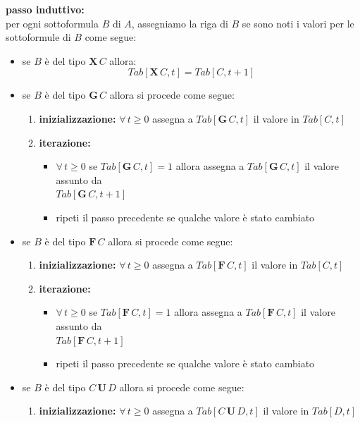 \documentclass[a4paper,12pt, oneside]{book}
\begin{document}
\newpage
\textbf{passo induttivo:}\\
per ogni sottoformula $B$ di $A$, assegniamo la riga di $B$ se sono noti
i valori per le sottoformule di $B$ come segue:
\begin{itemize}
  \item se $B$ è del tipo $\mathbf{X}\,C$ allora:
  \[Tab[\mathbf{X}\, C, t] = Tab[C, t + 1]\]
  \item se $B$ è del tipo $\mathbf{G}\,C$ allora si procede come segue:
  \begin{enumerate}
    \item \textbf{inizializzazione:} $\forall\,t\geq 0$ assegna a
    $Tab[\mathbf{G}\,C, t]$ il valore in $Tab[C, t]$
    \item \textbf{iterazione:}
    \begin{itemize}
      \item $\forall\,t\geq 0$ se $Tab[\mathbf{G}\,C, t] = 1$ allora assegna
      a $Tab[\mathbf{G}\, C, t]$ il valore assunto da \\$Tab[\mathbf{G}\, C,
      t+1]$
      \item ripeti il passo precedente se qualche valore è stato cambiato
    \end{itemize}
  \end{enumerate}
  \item se $B$ è del tipo $\mathbf{F}\,C$ allora si procede come segue:
  \begin{enumerate}
    \item \textbf{inizializzazione:} $\forall\,t\geq 0$ assegna a
    $Tab[\mathbf{F}\,C, t]$ il valore in $Tab[C, t]$
    \item \textbf{iterazione:}
    \begin{itemize}
      \item $\forall\,t\geq 0$ se $Tab[\mathbf{F}\,C, t] = 1$ allora assegna
      a $Tab[\mathbf{F}\, C, t]$ il valore assunto da \\$Tab[\mathbf{F}\, C,
      t+1]$
      \item ripeti il passo precedente se qualche valore è stato cambiato
    \end{itemize}
  \end{enumerate}
  \item se $B$ è del tipo $C\,\mathbf{U}\,D$ allora si procede come segue:
  \begin{enumerate}
    \item \textbf{inizializzazione:} $\forall\,t\geq 0$ assegna a
    $Tab[C\,\mathbf{U}\,D, t]$ il valore in $Tab[D, t]$

\end{enumerate}
\end{itemize}
\end{document}

